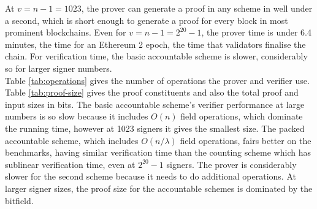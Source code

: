 \noindent At $v = n-1 = 1023$, the prover can generate a proof in any scheme in well under a second, which is short enough to generate a proof for every block in most prominent blockchains. Even for $v= n-1 =2^{20}-1$, the prover time is under 6.4 minutes, the time for an Ethereum 2 epoch, the time that validators finalise the chain. For verification time, the basic accountable scheme is slower, considerably so for larger signer numbers. \\

\noindent  Table \ref{tab:operations} gives the number of operations the prover and verifier use. Table \ref{tab:proof-size} gives the proof constituents and also the total proof and input sizes in bits. The basic accountable scheme's verifier performance at large numbers is so slow because it includes $O(n)$ field operations, which dominate the running time, however at 1023 signers it gives the smallest size. The packed accountable scheme, which includes $O(n/\lambda)$ field operations, fairs better on the benchmarks, having similar verification time than the counting scheme which has sublinear verification time, even at $2^{20}-1$ signers. 
The prover is considerably slower for the second scheme because it needs to do additional operations. 
At larger signer sizes, the proof size for the accountable schemes is dominated by the bitfield.

